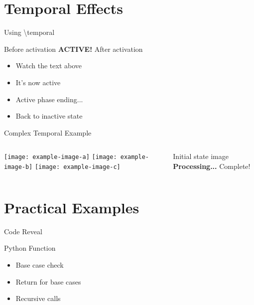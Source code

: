 \documentclass{beamer}
\begin{document}
\section{Temporal Effects}

\begin{frame}{Using \textbackslash temporal}
    \begin{center}
        {\Large Before activation}
        {\Huge\color{red}\textbf{ACTIVE!}}
        {\large\color{gray}After activation}
    \end{center}
    
    \vspace{1cm}
    
    \begin{itemize}
        \item<1-> Watch the text above
        \item<2-> It's now active
        \item<4-> Active phase ending...
        \item<5-> Back to inactive state
    \end{itemize}
\end{frame}

\begin{frame}{Complex Temporal Example}
    \begin{columns}
            {\texttt{[image: example-image-a]}}
            {\texttt{[image: example-image-b]}}
            {\texttt{[image: example-image-c]}}
            
            {Initial state image}
            {\color{red}\textbf{Processing...}}
            {\color{green}Complete!}
    \end{columns}
\end{frame}

\section{Practical Examples}

\begin{frame}{Code Reveal}
    \begin{block}{Python Function}
        \begin{semiverbatim}
        \end{semiverbatim}
    \end{block}
    
    \begin{itemize}
        \item<2-> Base case check
        \item<3-> Return for base cases
        \item<5-> Recursive calls
    \end{itemize}
\end{frame}
\end{document}
